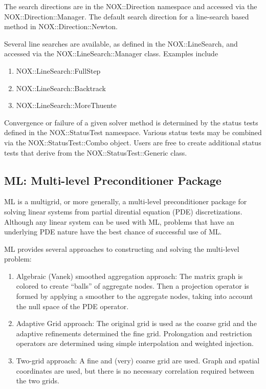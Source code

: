 \documentclass[12pt,relax]{SANDreport}
\begin{document}
The search directions are in the NOX::Direction namespace and accessed via the NOX::Direction::Manager. The
default search direction for a line-search based method in NOX::Direction::Newton. 

Several line searches are available, as defined in the NOX::LineSearch, and accessed via the
NOX::LineSearch::Manager class. Examples include 
\begin{enumerate}
\item NOX::LineSearch::FullStep
\item NOX::LineSearch::Backtrack
\item NOX::LineSearch::MoreThuente
\end{enumerate}

Convergence or failure of a given solver method is determined by the status tests defined in the
NOX::StatusTest namespace. Various status tests may be combined via the NOX::StatusTest::Combo object. Users
are free to create additional status tests that derive from the NOX::StatusTest::Generic class. 

\subsection{ML: Multi-level Preconditioner Package}

ML is a multigrid, or more generally, a multi-level preconditioner package for solving linear systems
from partial dirential equation (PDE) discretizations. Although any linear system can be used with ML,
problems that have an underlying PDE nature have the best chance of successful use of ML.

ML provides several approaches to constructing and solving the multi-level problem:
\begin{enumerate}
\item Algebraic (Vanek) smoothed aggregation approach:  The matrix graph is colored to 
create ``balls'' of aggregate nodes. Then a projection operator is formed by applying a smoother to the 
aggregate nodes, taking into account the null space of the PDE operator.
\item Adaptive Grid approach: The original grid is used as the coarse grid and the adaptive refinements
determined the fine grid.  Prolongation and restriction operators are determined using simple interpolation
and weighted injection.
\item Two-grid approach: A fine and (very) coarse grid are used.  Graph and spatial coordinates are used, 
but there is no necessary correlation required between the two grids.
\end{enumerate}
\end{document}
